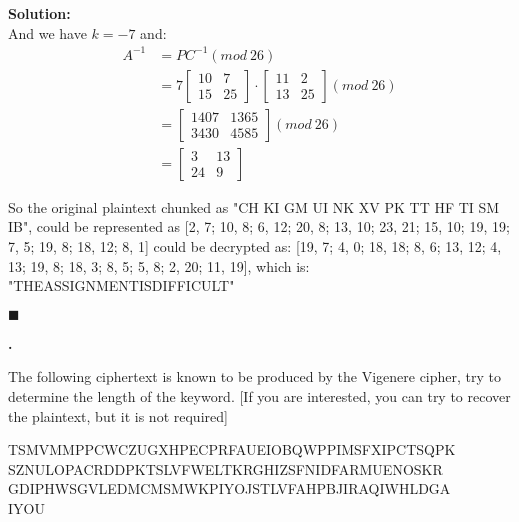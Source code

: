 \documentclass{article}
\newcounter{pcounter}                                   %
\newenvironment{problem}                                %
{                                                       %
    \stepcounter{pcounter}                              %
    \textbf{\arabic{pcounter}.}                         %
}{}                                                     %
\newenvironment{solution}                               %
{\textbf{Solution:} \\}{$\blacksquare$\newline}         %
\begin{document}
\begin{solution}
        And we have $k=-7$ and:
        \begin{align*}
            A^{-1} &= P C^{-1} (mod\ 26) \\
            &=  7
                \begin{bmatrix}
                    10 & 7 \\
                    15 & 25
                \end{bmatrix}
                \cdot
                \begin{bmatrix}
                    11 & 2 \\
                    13 & 25
                \end{bmatrix} (mod\ 26) \\
            &= 
                \begin{bmatrix}
                    1407 & 1365 \\
                    3430 & 4585
                \end{bmatrix} (mod\ 26) \\
            &= 
                \begin{bmatrix}
                    3 & 13 \\
                    24 & 9
                \end{bmatrix}
        \end{align*}

        So the original plaintext chunked as "CH KI GM UI NK XV PK TT HF TI SM IB", could be represented as 
        [2, 7; 10, 8; 6, 12; 20, 8; 13, 10; 23, 21; 15, 10; 19, 19; 7, 5; 19, 8; 18, 12; 8, 1]
        could be decrypted as:
        [19, 7; 4, 0; 18, 18; 8, 6; 13, 12; 4, 13; 19, 8; 18, 3; 8, 5; 5, 8; 2, 20; 11, 19], which is: \\
        "THEASSIGNMENTISDIFFICULT"

    \end{solution}

    \begin{problem}
        The following ciphertext is known to be produced by the Vigenere cipher, try to determine the length of the keyword. [If you are interested, you can try to recover the plaintext, but it is not required]

        TSMVMMPPCWCZUGXHPECPRFAUEIOBQWPPIMSFXIPCTSQPK \\
        SZNULOPACRDDPKTSLVFWELTKRGHIZSFNIDFARMUENOSKR \\
        GDIPHWSGVLEDMCMSMWKPIYOJSTLVFAHPBJIRAQIWHLDGA \\
        IYOU

    \end{problem}
    
\end{document}
